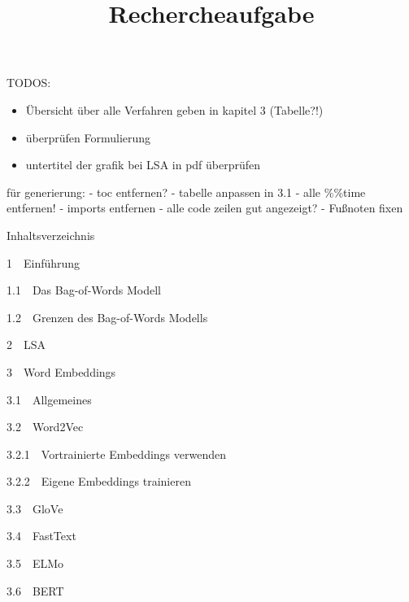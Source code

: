 \documentclass[11pt]{article}
\title{Rechercheaufgabe}
\providecommand{\tightlist}{%
      \setlength{\itemsep}{0pt}\setlength{\parskip}{0pt}}
\begin{document}
    
    \maketitle
    
    

    
    TODOS:

\begin{itemize}
\tightlist
\item
  Übersicht über alle Verfahren geben in kapitel 3 (Tabelle?!)
\item
  überprüfen Formulierung
\item
  untertitel der grafik bei LSA in pdf überprüfen
\end{itemize}

für generierung: - toc entfernen? - tabelle anpassen in 3.1 - alle
\%\%time entfernen! - imports entfernen - alle code zeilen gut
angezeigt? - Fußnoten fixen

    Inhaltsverzeichnis{}

{{1~~}Einführung}

{{1.1~~}Das Bag-of-Words Modell}

{{1.2~~}Grenzen des Bag-of-Words Modells}

{{2~~}LSA}

{{3~~}Word Embeddings}

{{3.1~~}Allgemeines}

{{3.2~~}Word2Vec}

{{3.2.1~~}Vortrainierte Embeddings verwenden}

{{3.2.2~~}Eigene Embeddings trainieren}

{{3.3~~}GloVe}

{{3.4~~}FastText}

{{3.5~~}ELMo}

{{3.6~~}BERT}
\end{document}
